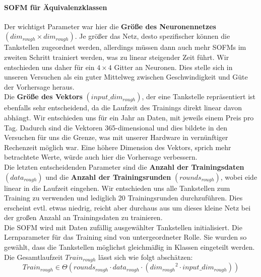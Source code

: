 \documentclass[11pt]{article}
\begin{document}
	\paragraph{SOFM für Äquivalenzklassen\\}
	Der wichtigst Parameter war hier die \textbf{Größe des Neuronennetzes} $(dim_{rough} \times dim_{rough})$. Je größer das Netz, desto spezifischer können die Tankstellen zugeordnet werden, allerdings müssen dann auch mehr SOFMs im zweiten Schritt trainiert werden, was zu linear steigender Zeit führt. Wir entschieden uns daher für ein $4 \times 4$ Gitter an Neuronen. Dies stelle sich in unseren Versuchen als ein guter Mittelweg zwischen Geschwindigkeit und Güte der Vorhersage heraus.\\
	Die \textbf{Größe des Vektors} $(input\_dim_{rough})$, der eine Tankstelle repräsentiert ist ebenfalls sehr entscheidend, da die Laufzeit des Trainings direkt linear davon abhängt. Wir entschieden uns für ein Jahr an Daten, mit jeweils einem Preis pro Tag. Dadurch sind die Vektoren 365-dimensional und dies bildete in den Versuchen für uns die Grenze, was mit unserer Hardware in vernünftiger Rechenzeit möglich war. Eine höhere Dimension des Vektors, sprich mehr betrachtete Werte, würde auch hier die Vorhersage verbessern.\\
	Die letzten entscheidenden Parameter sind die \textbf{Anzahl der Trainingsdaten} $(data_{rough})$ und die \textbf{Anzahl der Trainingsrunden} $(rounds_{rough})$, wobei eide linear in die Laufzeit eingehen. Wir entschieden uns alle Tankstellen zum Training zu verwenden und lediglich 20 Trainingsrunden durchzuführen. Dies erscheint evtl. etwas niedrig, reicht aber durchaus aus um dieses kleine Netz bei der großen Anzahl an Trainingsdaten zu trainieren.\\
	Die SOFM wird mit Daten zufällig ausgewählter Tankstellen initialisiert. Die Lernparameter für das Training sind von untergeordneter Rolle. Sie wurden so gewählt, dass die Tankstellen möglichst gleichmäßig in Klassen eingeteilt werden.\\
	Die Gesamtlaufzeit $Train_{rough}$ lässt sich wie folgt abschätzen:
	\[ Train_{rough} \in \Theta \left( rounds_{rough} \cdot data_{rough} \cdot \left( {dim_{rough}}^2 \cdot input\_dim_{rough} \right) \right) \]
	
\end{document}
